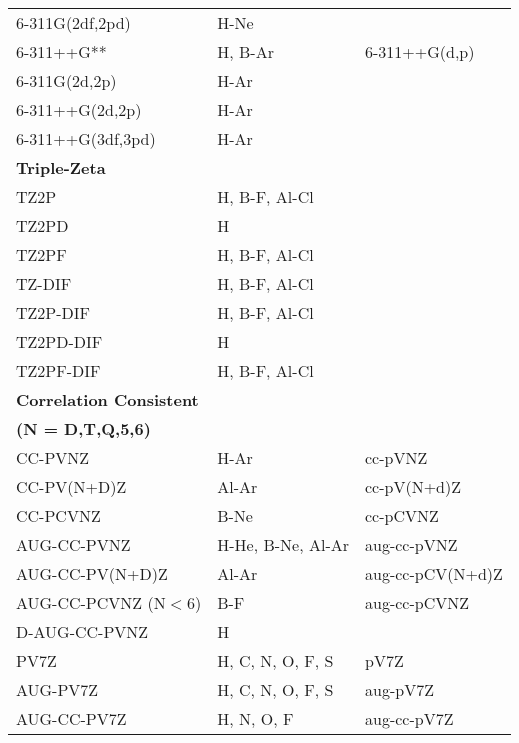 \begin{table}[tbp]
\begin{center}
\begin{tabular}{|l|l|l|}
        6-311G(2df,2pd)         & H-Ne                  &\\
	6-311++G**		& H, B-Ar		&6-311++G(d,p)\\
        6-311G(2d,2p)           & H-Ar                  &\\
        6-311++G(2d,2p)         & H-Ar                  &\\
        6-311++G(3df,3pd)       & H-Ar                  &\\
\hline
\hline
\textbf{Triple-Zeta} 			&				&\\	
\hline
	TZ2P			& H, B-F, Al-Cl		&\\
	TZ2PD			& H				&\\
	TZ2PF			& H, B-F, Al-Cl		&\\
	TZ-DIF			& H, B-F, Al-Cl		&\\ 	
	TZ2P-DIF		& H, B-F, Al-Cl		&\\
	TZ2PD-DIF		& H				&\\
	TZ2PF-DIF		& H, B-F, Al-Cl		&\\		
\hline
\hline
\textbf{Correlation Consistent}		&			&\\
\textbf{ (N = D,T,Q,5,6)}	&			&	\\
\hline
	CC-PVNZ			& H-Ar			&cc-pVNZ\\
	CC-PV(N+D)Z		& Al-Ar			&cc-pV(N+d)Z\\
        CC-PCVNZ                & B-Ne                  &cc-pCVNZ\\
	AUG-CC-PVNZ		& H-He, B-Ne, Al-Ar	&aug-cc-pVNZ\\
	AUG-CC-PV(N+D)Z		& Al-Ar			&aug-cc-pCV(N+d)Z\\
	AUG-CC-PCVNZ (N${<}$6)	& B-F			&aug-cc-pCVNZ\\
	D-AUG-CC-PVNZ		& H			&\\
	PV7Z			& H, C, N, O, F, S	&pV7Z\\
	AUG-PV7Z		& H, C, N, O, F, S	&aug-pV7Z\\
	AUG-CC-PV7Z             & H, N, O, F            &aug-cc-pV7Z\\
\hline
\hline
\hline
\end{tabular}
\end{center}
\end{table}

